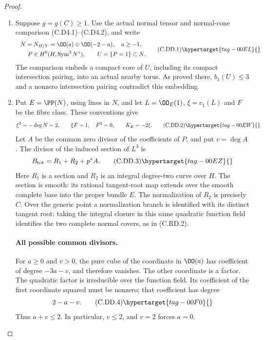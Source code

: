\begin{proof}

\begin{enumerate}[label={$\langle1\rangle$\arabic*.},leftmargin=*]
\item Suppose $g=g(C)\ge1$. Use the actual normal tensor and
normal-cone comparison (C.D4.1)--(C.D4.2), and write
\label{layout:II:2}
\[
\begin{gathered}
N=N_{H/Y}=\OO(a)\oplus\OO(-2-a),\quad a\ge-1,
 \\
\qquad P\in H^0(H,\operatorname{Sym}^3N^*),
 \qquad U=\{P=1\}\subset N.
\end{gathered}
\tag{C.DD.1}\hypertarget{tag-00EL}{}\label{cdp:eq:C.DD.1}
\]
The comparison embeds a compact core of $U$, including
its compact intersection pairing, into an actual nearby
torus. As proved there, $b_1(U)\le3$ and a nonzero
intersection pairing contradict this embedding.

\item Put $E=\PP(N)$, using lines in $N$, and let
$L=\OO_E(1)$, $\xi=c_1(L)$ and $F$ be the fibre class.
These conventions give
\[
 \xi^2=-\deg N=2,\qquad \xi F=1,\quad F^2=0,
 \qquad K_E=-2\xi.
\tag{C.DD.2}\hypertarget{tag-00EW}{}\label{cdp:eq:C.DD.2}
\]
Let $A$ be the common zero divisor of the coefficients
of $P$, and put $v=\deg A$. The divisor of the induced
section of $L^3$ is
\[
                    B_{\rm tot}=R_1+R_2+p^*A.
\tag{C.DD.3}\hypertarget{tag-00EZ}{}\label{cdp:eq:C.DD.3}
\]
Here $R_1$ is a section and $R_2$ is an integral
degree-two curve over $H$. The section is smooth:
its rational tangent-root map extends over the smooth
complete base into the proper bundle $E$.
The normalization of $R_2$ is precisely $C$. Over the
generic point a normalization branch is identified
with its distinct tangent root; taking the integral
closure in this same quadratic function field identifies
the two complete normal covers, as in (C.RD.2).

\paragraph{All possible common divisors.}
For $a\ge0$ and $v>0$, the pure cube of the coordinate
in $\OO(a)$ has coefficient of degree $-3a-v$, and
therefore vanishes. The other coordinate is a factor.
The quadratic factor is irreducible over the function
field. Its coefficient of the first coordinate squared
must be nonzero; that coefficient has degree
\[
                              2-a-v.
\tag{C.DD.4}\hypertarget{tag-00F0}{}\label{cdp:eq:C.DD.4}
\]
Thus $a+v\le2$. In particular, $v\le2$, and $v=2$
forces $a=0$.


\end{enumerate}
\end{proof}
